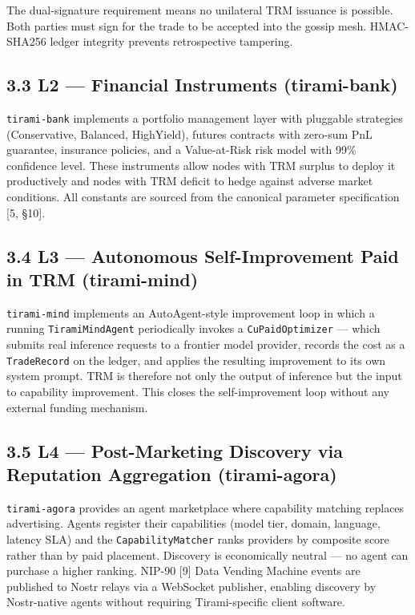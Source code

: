 \documentclass[
  11pt,
]{article}
\begin{document}
The dual-signature requirement means no unilateral TRM issuance is
possible. Both parties must sign for the trade to be accepted into the
gossip mesh. HMAC-SHA256 ledger integrity prevents retrospective
tampering.

\subsection{3.3 L2 --- Financial Instruments
(tirami-bank)}\label{l2-financial-instruments-tirami-bank}

\texttt{tirami-bank} implements a portfolio management layer with
pluggable strategies (Conservative, Balanced, HighYield), futures
contracts with zero-sum PnL guarantee, insurance policies, and a
Value-at-Risk risk model with 99\% confidence level. These instruments
allow nodes with TRM surplus to deploy it productively and nodes with
TRM deficit to hedge against adverse market conditions. All constants
are sourced from the canonical parameter specification {[}5, §10{]}.

\subsection{3.4 L3 --- Autonomous Self-Improvement Paid in TRM
(tirami-mind)}\label{l3-autonomous-self-improvement-paid-in-trm-tirami-mind}

\texttt{tirami-mind} implements an AutoAgent-style improvement loop in
which a running \texttt{TiramiMindAgent} periodically invokes a
\texttt{CuPaidOptimizer} --- which submits real inference requests to a
frontier model provider, records the cost as a \texttt{TradeRecord} on
the ledger, and applies the resulting improvement to its own system
prompt. TRM is therefore not only the output of inference but the input
to capability improvement. This closes the self-improvement loop without
any external funding mechanism.

\subsection{3.5 L4 --- Post-Marketing Discovery via Reputation
Aggregation
(tirami-agora)}\label{l4-post-marketing-discovery-via-reputation-aggregation-tirami-agora}

\texttt{tirami-agora} provides an agent marketplace where capability
matching replaces advertising. Agents register their capabilities (model
tier, domain, language, latency SLA) and the \texttt{CapabilityMatcher}
ranks providers by composite score rather than by paid placement.
Discovery is economically neutral --- no agent can purchase a higher
ranking. NIP-90 {[}9{]} Data Vending Machine events are published to
Nostr relays via a WebSocket publisher, enabling discovery by
Nostr-native agents without requiring Tirami-specific client software.
\end{document}
